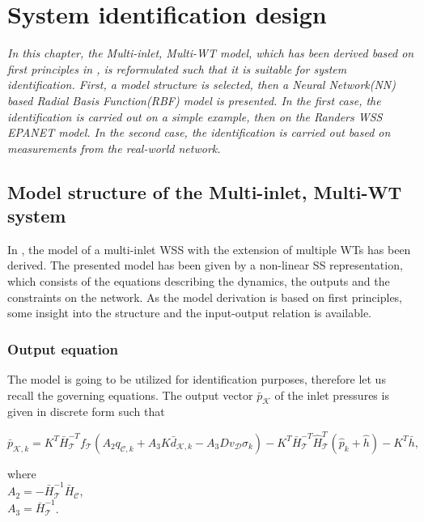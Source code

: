 \chapter{System identification design}
\label{identification_design}

\emph{In this chapter, the Multi-inlet, Multi-WT model, which has been derived based on first principles in , is reformulated such that it is suitable for system identification. First, a model structure is selected, then a Neural Network(NN) based Radial Basis Function(RBF) model is presented. In the first case, the identification is carried out on a simple example, then on the Randers WSS EPANET model. In the second case, the identification is carried out based on measurements from the real-world network.}

\section{Model structure of the Multi-inlet, Multi-WT system}
\label{model_structure_of_the_multi_inlet_multi_WT_system}

In , the model of a multi-inlet WSS with the extension of multiple WTs has been derived. The presented model has been given by a non-linear SS representation, which consists of the equations describing the dynamics, the outputs and the constraints on the network. As the model derivation is based on first principles, some insight into the structure and the input-output relation is available. 

\subsection{Output equation}
\label{output_eq_identification}

The model is going to be utilized for identification purposes, therefore let us recall the governing equations. The output vector $\bar{p}_{\mathcal{K}}$ of the inlet pressures is given in discrete form such that

\begin{equation}
  \label{recall_output_eq}
  \bar{p}_{\mathcal{K},k} = K^T \bar{H}^{-T}_{\mathcal{T}}f_{\mathcal{T}}(A_2 q_{\mathcal{C},k} + A_3 K \bar{d}_{\mathcal{K},k} - A_3 D v_{\mathcal{D}} \sigma_k) - K^T\bar{H}^{-T}_{\mathcal{T}}\hat{H}^{T}_{\mathcal{T}} (\hat{p}_k + \hat{h}) - K^T\bar{h} ,
\end{equation} 

\begin{minipage}[t]{0.4\textwidth}
where\\
\hspace*{8mm} $A_2 = -\bar{H}^{-1}_{\mathcal{T}} \bar{H}_{\mathcal{C}} $, \vspace*{1.5mm}\\
\hspace*{8mm} $A_3 = \bar{H}^{-1}_{\mathcal{T}}$.
\end{minipage}

